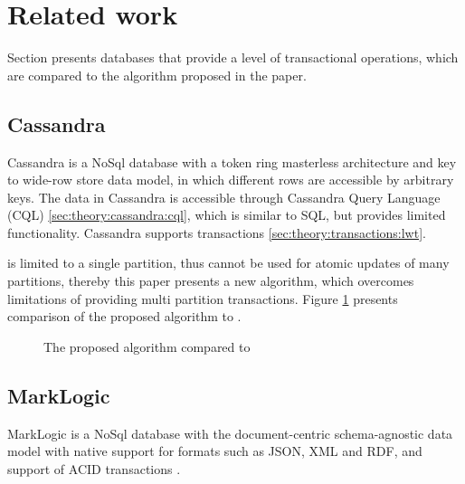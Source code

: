 \section{Related work}
Section presents databases that provide a level of transactional operations, which are compared to the algorithm proposed in the paper.

\subsection{Cassandra}
Cassandra is a NoSql database with a token ring masterless architecture and key to wide-row store data model, 
in which different rows are accessible by arbitrary keys. 
The data in Cassandra is accessible through Cassandra Query Language (CQL) \ref{sec:theory:cassandra:cql}, which is similar to SQL, but provides limited functionality. Cassandra supports \lwt transactions \ref{sec:theory:transactions:lwt}.

\lwt is limited to a single partition, thus \lwt cannot be used for atomic updates of many partitions, thereby this paper presents a new algorithm, which overcomes limitations of \lwt providing multi partition transactions.
Figure \ref{fig:mppVsLwt} presents comparison of the proposed algorithm to \lwt.

\begin{figure}[hbt]
  \setlength{\unitlength}{1.3cm}  
  \caption{The proposed algorithm compared to \lwt}
  \label{fig:mppVsLwt}
\end{figure}

\subsection{MarkLogic}
MarkLogic is a NoSql database with the document-centric schema-agnostic data model \cite{markLogicDataModel} with native support for formats such as JSON, XML and RDF, and support of ACID transactions \cite{markLogicAcid}.

